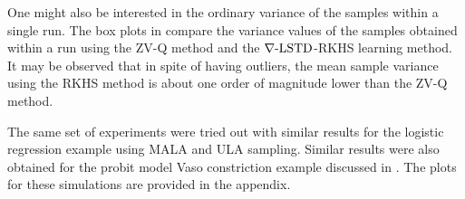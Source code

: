 One might also be interested in the ordinary variance of the samples within a single run. The box plots in  compare the variance values of the samples obtained within a run using the ZV-Q method and the $\nabla\text{-LSTD}$-RKHS learning method. It may be observed that in spite of having outliers, the mean sample variance using the RKHS method is about one order of magnitude lower than the ZV-Q method.

The same set of experiments were tried out with similar results for the logistic regression example using MALA and ULA sampling. Similar results were also obtained for the probit model Vaso constriction example discussed in \cite{papmirgir14}. The plots for these simulations are provided in the appendix. %

\begin{figure}[htbp]
	\centering
	\mbox{
	}
	\mbox{
}
\end{figure}
